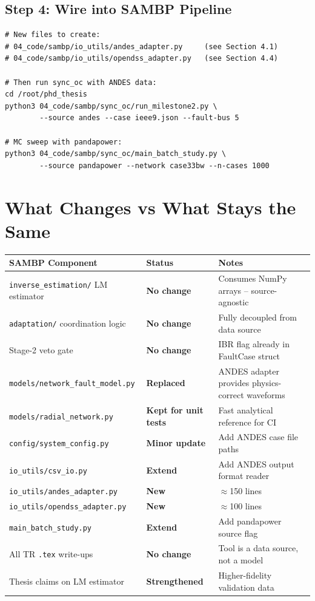 \documentclass[11pt,a4paper]{article}
\begin{document}
\subsection{Step 4: Wire into SAMBP Pipeline}

\begin{lstlisting}[style=bash]
# New files to create:
# 04_code/sambp/io_utils/andes_adapter.py     (see Section 4.1)
# 04_code/sambp/io_utils/opendss_adapter.py   (see Section 4.4)

# Then run sync_oc with ANDES data:
cd /root/phd_thesis
python3 04_code/sambp/sync_oc/run_milestone2.py \
        --source andes --case ieee9.json --fault-bus 5

# MC sweep with pandapower:
python3 04_code/sambp/sync_oc/main_batch_study.py \
        --source pandapower --network case33bw --n-cases 1000
\end{lstlisting}

\section{What Changes vs What Stays the Same}

\begin{longtable}{p{5.5cm}p{2.5cm}p{6cm}}
\toprule
\textbf{SAMBP Component} & \textbf{Status} & \textbf{Notes} \\
\midrule
\endhead
\texttt{inverse\_estimation/} LM estimator & \textbf{No change} & Consumes NumPy arrays -- source-agnostic \\[4pt]
\texttt{adaptation/} coordination logic    & \textbf{No change} & Fully decoupled from data source \\[4pt]
Stage-2 veto gate                          & \textbf{No change} & IBR flag already in FaultCase struct \\[4pt]
\texttt{models/network\_fault\_model.py}   & \textbf{Replaced} & ANDES adapter provides physics-correct waveforms \\[4pt]
\texttt{models/radial\_network.py}         & \textbf{Kept for unit tests} & Fast analytical reference for CI \\[4pt]
\texttt{config/system\_config.py}          & \textbf{Minor update} & Add ANDES case file paths \\[4pt]
\texttt{io\_utils/csv\_io.py}             & \textbf{Extend} & Add ANDES output format reader \\[4pt]
\texttt{io\_utils/andes\_adapter.py}       & \textbf{New} & $\approx$150 lines \\[4pt]
\texttt{io\_utils/opendss\_adapter.py}     & \textbf{New} & $\approx$100 lines \\[4pt]
\texttt{main\_batch\_study.py}             & \textbf{Extend} & Add pandapower source flag \\[4pt]
All TR \texttt{.tex} write-ups             & \textbf{No change} & Tool is a data source, not a model \\[4pt]
Thesis claims on LM estimator              & \textbf{Strengthened} & Higher-fidelity validation data \\
\bottomrule
\end{longtable}
\end{document}
